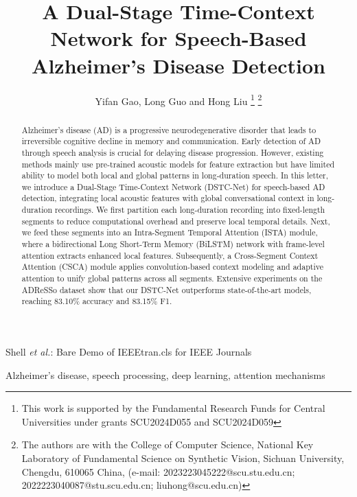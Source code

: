 \documentclass[journal]{IEEEtran}
\begin{document}
\title{A Dual-Stage Time-Context Network for Speech-Based Alzheimer’s Disease Detection}

\author{Yifan Gao, Long Guo and Hong Liu
\thanks{This work is supported by the Fundamental Research Funds for Central Universities under grants SCU2024D055 and SCU2024D059 }
\thanks{The authors are with the College of Computer Science, National Key Laboratory of Fundamental Science on Synthetic Vision, Sichuan University, Chengdu, 610065 China, (e-mail: 2023223045222@scu.stu.edu.cn; 2022223040087@stu.scu.edu.cn; liuhong@scu.edu.cn)}

}
\markboth{}
{Shell \MakeLowercase{\textit{et al.}}: Bare Demo of IEEEtran.cls for IEEE Journals}
\maketitle

\begin{abstract}
Alzheimer’s disease (AD) is a progressive neurodegenerative disorder that leads to irreversible cognitive decline in memory and communication. 
Early detection of AD through speech analysis is crucial for delaying disease progression. 
However, existing methods mainly use pre-trained acoustic models for feature extraction but have limited ability to model both local and global patterns in long-duration speech. 
In this letter, we introduce a Dual-Stage Time-Context Network (DSTC-Net) for speech-based AD detection, integrating local acoustic features with global conversational context in long-duration recordings.
We first partition each long-duration recording into fixed-length segments to reduce computational overhead and preserve local temporal details.
Next, we feed these segments into an Intra-Segment Temporal Attention (ISTA) module, where a bidirectional Long Short-Term Memory (BiLSTM) network with frame-level attention extracts enhanced local features.
Subsequently, a Cross-Segment Context Attention (CSCA) module applies convolution-based context modeling and adaptive attention to unify global patterns across all segments.
Extensive experiments on the ADReSSo dataset show that our DSTC-Net outperforms state-of-the-art models, reaching 83.10\% accuracy and 83.15\% F1.




\end{abstract}

\begin{IEEEkeywords}
Alzheimer’s disease, speech processing, deep learning, attention mechanisms
\end{IEEEkeywords}
\end{document}
